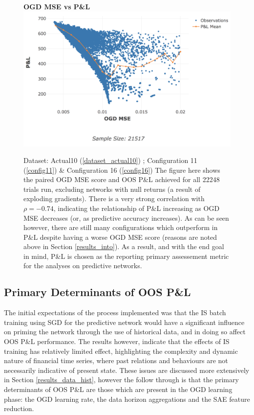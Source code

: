 \documentclass[a4paper,11pt,oneside]{article}
\theoremstyle{plain}
\theoremstyle{definition}
\begin{document}
		\begin{figure}[H]
		\textbf{OGD MSE vs P\&L}
		\centering
		\includegraphics[scale=0.45]{images/results/intro/ogdmse_pl.png}
		\caption[OGD MSE vs OOS P\&L]
		{Dataset: Actual10 (\ref{dataset_actual10}) ; Configuration 11 (\ref{config11}) \&  Configuration 16 (\ref{config16}) \newline 
			The figure here shows the paired OGD MSE score and OOS P\&L achieved for all 22248 trials run, excluding networks with null returns (a result of exploding gradients). There is a very strong correlation with $\rho = -0.74$, indicating the relationship of P\&L increasing as OGD MSE decreases (or, as predictive accuracy increases). As can be seen however, there are still many configurations which outperform in P\&L despite having a worse OGD MSE score (reasons are noted above in Section \ref{results_into}). As a result, and with the end goal in mind, P\&L is chosen as the reporting primary assessement metric for the analyses on predictive networks. }
		\label{figure-ogdmse_pl}
	\end{figure}
	
	\newpage
	\subsection{Primary Determinants of OOS P\&L}\label{results_oos_pl}
	
	The initial expectations of the process implemented was that the IS batch training using SGD for the predictive network would have a significant influence on priming the network through the use of historical data, and in doing so affect OOS P\&L performance. The results however, indicate that the effects of IS training has relatively limited effect, highlighting the complexity and dynamic nature of financial time series, where past relations and behaviours are not necessarily indicative of present state. These issues are discussed more extensively in Section \ref{results_data_hist}, however the follow through is that the primary determinants of OOS P\&L are those which are present in the OGD learning phase: the OGD learning rate, the data horizon aggregations and the SAE feature reduction.\newline
	
\end{document}
